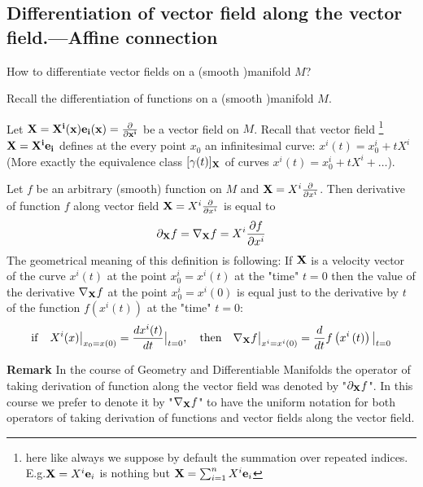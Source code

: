 \documentclass[12pt]{article}
\theoremstyle{theorem}
\numberwithin{equation}{section}
\begin{document}
\subsection {Differentiation of vector field along the vector field.---Affine connection}

How to differentiate vector fields on a (smooth )manifold  $M$?




Recall  the differentiation  of functions on a (smooth )manifold  $M$.







Let $\bf X=X^i(x){\bf e}_i(x)={\partial\over \partial x^i}$ be a vector field on $M$.
Recall that vector field
\footnote{here like always we suppose by default the summation over repeated indices.
E.g.${\bf X}=X^i{\bf e}_i$ is nothing but
${\bf X}=\sum_{i=1}^nX^i{\bf e}_i$}
 $\bf X=X^i{\bf e}_i$ defines at the
every point $x_0$ an infinitesimal curve: $x^i(t)=x^i_0+tX^i$
(More exactly the equivalence class $[\gamma(t)]_{\bf X} $
of curves $x^i(t)=x^i_0+tX^i+\dots$).


Let $f$ be an arbitrary (smooth) function on $M$ and ${\bf X}=X^i{\partial\over \partial x^i}$.
 Then derivative
of function $f$ along vector field ${\bf X}=X^i{\partial\over \partial x^i}$ is equal to
                              $$
             \partial_{\bf X}f= \nabla_{\bf X}f
                  =X^i{\partial f\over \partial x^i}
                                $$
The geometrical meaning of this definition is following:
If ${\bf X}$ is a velocity vector of the curve $x^i(t)$ at the point $x^i_0=x^i(t)$ at the "time"
$t=0$ then the value of the derivative $\nabla_{\bf X}f$ at the point $x^i_0=x^i(0)$
is equal just to the derivative by $t$ of the function $f(x^i(t))$ at the "time" $t=0$:
\begin{equation}\label{meaningofderivative}
{\rm if}\quad
    X^i(x)\big\vert_{x_0=x(0)}={dx^i(t)\over dt}\big\vert_{t=0},\quad
    {\rm then}\quad
\nabla_{\bf X} f\big\vert_{x^i=x^i(0)}=
{d\over dt}f\left(x^i\left(t\right)\right)\big\vert_{t=0}
\end{equation}


{\bf Remark} In the course of Geometry and Differentiable Manifolds the operator
 of taking derivation of function along the vector field
was denoted by "$\partial_{\bf X}f$". In this course we prefer to denote it by "$\nabla_{\bf X}f$"
to have the uniform notation for both operators of taking derivation of functions and vector fields
along the vector field.
\end{document}
